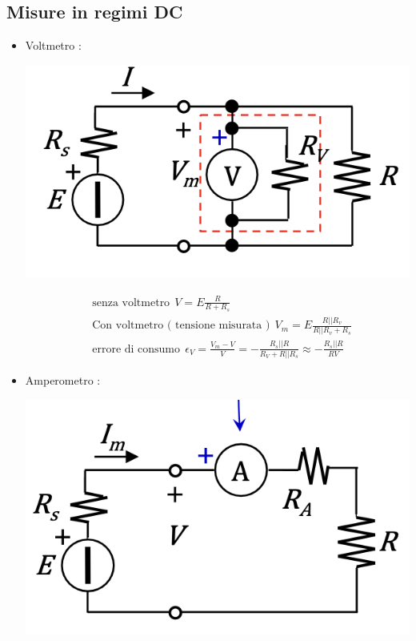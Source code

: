\documentclass{article}
\theoremstyle{definition}
\begin{document}
\subsection{Misure in regimi DC}
	\begin{itemize}
	\item Voltmetro : \\
	\begin{center}
		\includegraphics[scale=0.40]{immagini/volt}
	\end{center}
		\begin{align*}
		& \text{senza voltmetro} \ \ V=E\frac{R}{R+R_s}\\
		& \text{Con voltmetro ( tensione misurata )} \ \ V_m=E\frac{R || R_v}{R||R_v+R_s}\\
		& \text{errore di consumo} \ \ \epsilon_V=\frac{V_m-V}{V}=-\frac{R_s || R}{R_V+R||R_s}\approx -\frac{R_s||R}{RV}
	\end{align*}
	\item Amperometro :\\
	\begin{center}
		\includegraphics[scale=0.45]{immagini/amp}

\end{center}
\end{itemize}
\end{document}

